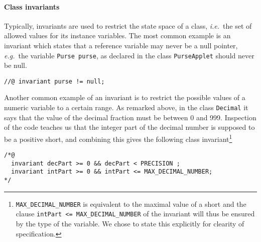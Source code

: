 \documentclass[a4paper]{llncs}
\begin{document}






\paragraph{Class invariants}
Typically, invariants are used to restrict the state space of a class,
\emph{i.e.}~the set of allowed values for its instance variables. The
most common example is an invariant which states that a reference
variable may never be a null pointer, \emph{e.g.}~the variable
\texttt{Purse purse}, as declared in the class \texttt{PurseApplet}
should never be null.
\begin{verbatim}
//@ invariant purse != null;
\end{verbatim}
Another common example of an invariant is to restrict the possible
values of a numeric variable to a certain range. As remarked above, in
the class \texttt{Decimal} it says that the value of the decimal
fraction must be between 0 and 999. Inspection of the code teaches us
that the integer part of the decimal number is supposed to be a
positive short, and combining this gives the following class
invariant\footnote{\texttt{MAX\_DECIMAL\_NUMBER} is equivalent to the
maximal value of a short and the clause \texttt{intPart <=
MAX\_DECIMAL\_NUMBER} of the invariant will thus be
ensured by the type of the variable. We chose to state this explicitly
for clearity of specification.}
\begin{verbatim}
/*@
  invariant decPart >= 0 && decPart < PRECISION ;
  invariant intPart >= 0 && intPart <= MAX_DECIMAL_NUMBER;
*/
\end{verbatim}
\end{document}
